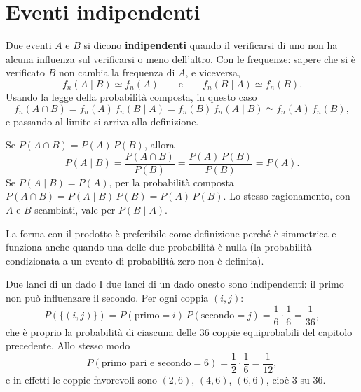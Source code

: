 \section{Eventi indipendenti}

Due eventi $A$ e $B$ si dicono \textbf{indipendenti} quando il verificarsi di uno non ha alcuna influenza sul
verificarsi o meno dell'altro. Con le frequenze: sapere che si è verificato $B$ non cambia la frequenza di $A$, e
viceversa,
\[ f_n(A \mid B) \simeq f_n(A) \qquad\text{e}\qquad f_n(B \mid A) \simeq f_n(B) . \]
Usando la legge della probabilità composta, in questo caso
\[ f_n(A \cap B) = f_n(A)\, f_n(B \mid A) = f_n(B)\, f_n(A \mid B) \simeq f_n(A)\, f_n(B) , \]
e passando al limite si arriva alla definizione.



\begin{dimostrazione}
 Se $P(A \cap B) = P(A)\,P(B)$, allora
\[ P(A \mid B) = \frac{P(A \cap B)}{P(B)} = \frac{P(A)\,P(B)}{P(B)} = P(A) . \]
 Se $P(A \mid B) = P(A)$, per la probabilità composta
$P(A \cap B) = P(A \mid B)\,P(B) = P(A)\,P(B)$.
 Lo stesso ragionamento, con $A$ e $B$ scambiati, vale per $P(B \mid A)$.
\end{dimostrazione}

La forma con il prodotto è preferibile come definizione perché è simmetrica e funziona anche quando una delle due
probabilità è nulla (la probabilità condizionata a un evento di probabilità zero non è definita).

\begin{esempio}{Due lanci di un dado}
I due lanci di un dado onesto sono indipendenti: il primo non può influenzare il secondo. Per ogni coppia $(i, j)$:
\[ P(\{(i, j)\}) = P(\text{primo} = i)\, P(\text{secondo} = j) = \frac{1}{6} \cdot \frac{1}{6} = \frac{1}{36} , \]
che è proprio la probabilità di ciascuna delle 36 coppie equiprobabili del capitolo precedente. Allo stesso modo
\[ P(\text{primo pari e secondo} = 6) = \frac{1}{2} \cdot \frac{1}{6} = \frac{1}{12} , \]
e in effetti le coppie favorevoli sono $(2,6)$, $(4,6)$, $(6,6)$, cioè 3 su 36.
\end{esempio}

